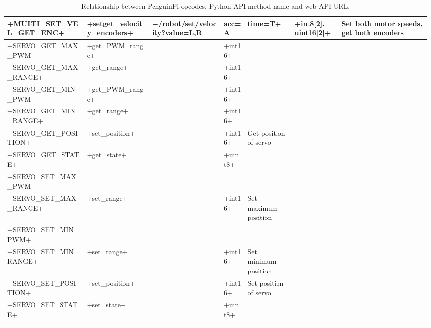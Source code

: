 \documentclass[11pt,fleqn]{article}
\begin{document}
\begin{landscape}
\begin{longtable}{|l|l|l|l|p{5cm}|}
+MULTI_SET_VEL_GET_ENC+ & +setget_velocity_encoders+ & +/robot/set/velocity?value=L,R&acc=A&time=T+  & +int8[2], uint16[2]+ & Set both motor speeds, get both encoders  \\ \hline
+SERVO_GET_MAX_PWM+ & +get_PWM_range+ & & +int16+ & \\
+SERVO_GET_MAX_RANGE+ & +get_range+ & & +int16+ & \\
+SERVO_GET_MIN_PWM+ & +get_PWM_range+ & & +int16+ & \\
+SERVO_GET_MIN_RANGE+ & +get_range+ & &  +int16+ & \\
+SERVO_GET_POSITION+ & +set_position+ & & +int16+ & Get position of servo \\
+SERVO_GET_STATE+ & +get_state+ & & +uint8+ & \\ \hdashline
+SERVO_SET_MAX_PWM+ & & & &  \\
+SERVO_SET_MAX_RANGE+ & +set_range+ & & +int16+ & Set maximum position \\
+SERVO_SET_MIN_PWM+ &  & & &                                     \\
+SERVO_SET_MIN_RANGE+ & +set_range+ &             & +int16+ & Set minimum position \\
+SERVO_SET_POSITION+ & +set_position+ &                 & +int16+ & Set position of servo \\
+SERVO_SET_STATE+ & +set_state+ & & +uint8+ &\\  \hline
\caption{Relationship between PenguinPi opcodes, Python API method name and web API URL.}\label{tab:api-xref}
\end{longtable}
\end{landscape}


%
%


\UndefineShortVerb{\+}
\end{document}

